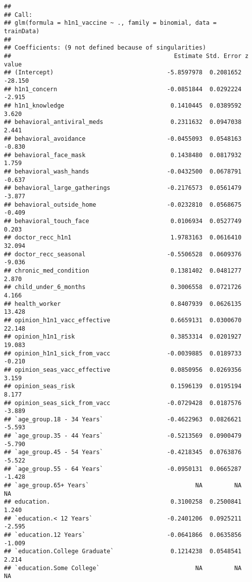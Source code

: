 \documentclass[
]{article}
\begin{document}
\begin{verbatim}
## 
## Call:
## glm(formula = h1n1_vaccine ~ ., family = binomial, data = trainData)
## 
## Coefficients: (9 not defined because of singularities)
##                                              Estimate Std. Error z value
## (Intercept)                                -5.8597978  0.2081652 -28.150
## h1n1_concern                               -0.0851844  0.0292224  -2.915
## h1n1_knowledge                              0.1410445  0.0389592   3.620
## behavioral_antiviral_meds                   0.2311632  0.0947038   2.441
## behavioral_avoidance                       -0.0455093  0.0548163  -0.830
## behavioral_face_mask                        0.1438480  0.0817932   1.759
## behavioral_wash_hands                      -0.0432500  0.0678791  -0.637
## behavioral_large_gatherings                -0.2176573  0.0561479  -3.877
## behavioral_outside_home                    -0.0232810  0.0568675  -0.409
## behavioral_touch_face                       0.0106934  0.0527749   0.203
## doctor_recc_h1n1                            1.9783163  0.0616410  32.094
## doctor_recc_seasonal                       -0.5506528  0.0609376  -9.036
## chronic_med_condition                       0.1381402  0.0481277   2.870
## child_under_6_months                        0.3006558  0.0721726   4.166
## health_worker                               0.8407939  0.0626135  13.428
## opinion_h1n1_vacc_effective                 0.6659131  0.0300670  22.148
## opinion_h1n1_risk                           0.3853314  0.0201927  19.083
## opinion_h1n1_sick_from_vacc                -0.0039885  0.0189733  -0.210
## opinion_seas_vacc_effective                 0.0850956  0.0269356   3.159
## opinion_seas_risk                           0.1596139  0.0195194   8.177
## opinion_seas_sick_from_vacc                -0.0729428  0.0187576  -3.889
## `age_group.18 - 34 Years`                  -0.4622963  0.0826621  -5.593
## `age_group.35 - 44 Years`                  -0.5213569  0.0900479  -5.790
## `age_group.45 - 54 Years`                  -0.4218345  0.0763876  -5.522
## `age_group.55 - 64 Years`                  -0.0950131  0.0665287  -1.428
## `age_group.65+ Years`                              NA         NA      NA
## education.                                  0.3100258  0.2500841   1.240
## `education.< 12 Years`                     -0.2401206  0.0925211  -2.595
## `education.12 Years`                       -0.0641866  0.0635856  -1.009
## `education.College Graduate`                0.1214238  0.0548541   2.214
## `education.Some College`                           NA         NA      NA

\end{verbatim}
\end{document}
